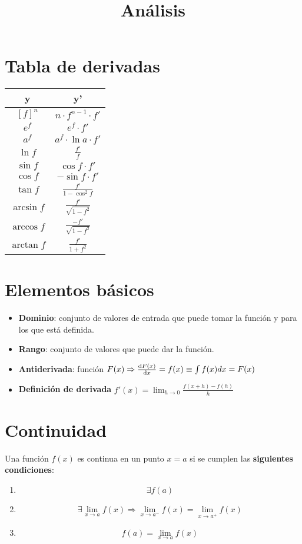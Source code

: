 \documentclass{article}
\title{Análisis}
\date{}
\author{}
\theoremstyle{plain}
\begin{document}
\maketitle
\section*{Tabla de derivadas}

\begin{table}
    \centering
    \begin{tabular}{|c|c|}
        \hline
        y & y'\\
        \hline
        $[f]^n$  & $n\cdot f^{n-1}\cdot f'$\\
        $e^{f}$ & $e^{f}\cdot f'$ \\
        $a^f$ & $a^f\cdot \ln a \cdot f'$ \\
        $\ln f$ & $\frac{f'}{f}$ \\
        $\sin f$ & $\cos f \cdot f'$\\
        $\cos f$ & $-\sin f\cdot f'$\\
        $\tan f$ & $ \frac{f'}{1-\cos ^2 f}$\\
        $\arcsin f$ & $ \frac{f'}{\sqrt{1-f^2}}$\\
        $\arccos f$ & $ \frac{-f'}{\sqrt{1-f^2}}$\\
        $\arctan f$ & $ \frac{f'}{1+f^2}$\\    
        \hline
    \end{tabular}
\end{table}

\pagebreak
\section*{Elementos básicos}
\begin{itemize}
    \item \textbf{Dominio}: conjunto de valores de entrada que puede tomar la función y para los que está definida.
    \item \textbf{Rango}: conjunto de valores que puede dar la función.
    \item \textbf{Antiderivada}: función $F(x) \Rightarrow \dv {F(x)}{x}=f(x) \equiv \int f(x)dx = F(x)$
    \item \textbf{Definición de derivada} $f'(x)= \lim_{h \to 0} \frac{f(x+h)-f(h)}{h}$ 
\end{itemize}
\pagebreak
\section*{Continuidad}
Una función $f(x)$ es continua en un punto $x=a$ si se cumplen las \textbf{siguientes condiciones}:
\begin{enumerate}
    \item \[
        \exists f(a)
    \]
    \item \[
        \exists \lim_{x \to a} f(x) \Rightarrow \lim_{x \to a^-} f(x) = \lim_{x \to a^+}f(x)
    \]
    \item \[
        f(a)=\lim_{x \to a} f(x)
    \]
\end{enumerate}
\end{document}
